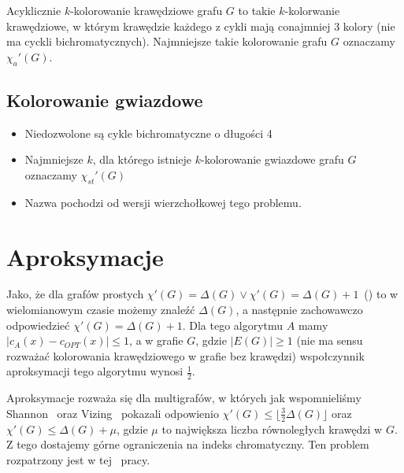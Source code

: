 \documentclass[12pt]{article}
\begin{document}
Acyklicznie $k$-kolorowanie krawędziowe grafu $G$ to takie $k$-kolorwanie krawędziowe, w którym krawędzie każdego z cykli mają conajmniej 3 kolory (nie ma cyckli bichromatycznych). Najmniejsze takie kolorowanie grafu $G$ oznaczamy $\chi_a'(G)$.

\subsection{Kolorowanie gwiazdowe}

\begin{itemize}
    \item Niedozwolone są cykle bichromatyczne o długości 4
    \item Najmniejsze $k$, dla którego istnieje $k$-kolorowanie gwiazdowe grafu $G$ oznaczamy $\chi_{st}'(G)$
    \item Nazwa pochodzi od wersji wierzchołkowej tego problemu.
\end{itemize}

\section{Aproksymacje}

Jako, że dla grafów prostych $\chi'(G) = \Delta(G) \lor \chi'(G) = \Delta(G) + 1$~(\cite{1571980075458819456}) to w wielomianowym czasie możemy znaleźć $\Delta(G)$, a następnie zachowawczo odpowiedzieć $\chi'(G) = \Delta(G) + 1$. Dla tego algorytmu $A$ mamy $|c_A(x) - c_{OPT}(x)| \leq 1$, a w grafie $G$, gdzie $|E(G)| \geq 1$ (nie ma sensu rozważać kolorowania krawędziowego w grafie bez krawędzi) wspołczynnik aproksymacji tego algorytmu wynosi $\frac{1}{2}$.

Aproksymacje rozważa się dla multigrafów, w których jak wspomnieliśmy Shannon~\cite{Shannon1949ATO} oraz Vizing~\cite{1571980075458819456} pokazali odpowienio $\chi'(G) \leq \lfloor \frac{3}{2}\Delta(G) \rfloor$ oraz $\chi'(G) \leq \Delta(G) + \mu$, gdzie $\mu$ to największa liczba równoległych krawędzi w $G$. Z tego dostajemy górne ograniczenia na indeks chromatyczny. Ten problem rozpatrzony jest w tej~\cite{10.1007/11427186_53} pracy.



\end{document}
